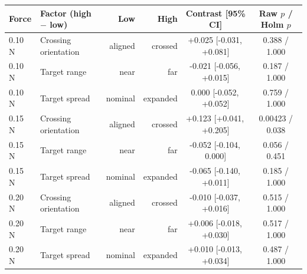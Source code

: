 \begingroup
\setlength{\tabcolsep}{2pt}
\begin{tabular}{@{}llrrcc@{}}
\toprule
Force & Factor (high $-$ low) & Low & High & Contrast [95\% CI] & Raw $p$ / Holm $p$ \\
\midrule
0.10 N & Crossing orientation & aligned & crossed & +0.025 [-0.031,\, +0.081] & 0.388 / 1.000 \\
0.10 N & Target range & near & far & -0.021 [-0.056,\, +0.015] & 0.187 / 1.000 \\
0.10 N & Target spread & nominal & expanded & 0.000 [-0.052,\, +0.052] & 0.759 / 1.000 \\
0.15 N & Crossing orientation & aligned & crossed & +0.123 [+0.041,\, +0.205] & 0.00423 / 0.038 \\
0.15 N & Target range & near & far & -0.052 [-0.104,\, 0.000] & 0.056 / 0.451 \\
0.15 N & Target spread & nominal & expanded & -0.065 [-0.140,\, +0.011] & 0.185 / 1.000 \\
0.20 N & Crossing orientation & aligned & crossed & -0.010 [-0.037,\, +0.016] & 0.515 / 1.000 \\
0.20 N & Target range & near & far & +0.006 [-0.018,\, +0.030] & 0.517 / 1.000 \\
0.20 N & Target spread & nominal & expanded & +0.010 [-0.013,\, +0.034] & 0.487 / 1.000 \\
\bottomrule
\end{tabular}
\endgroup
